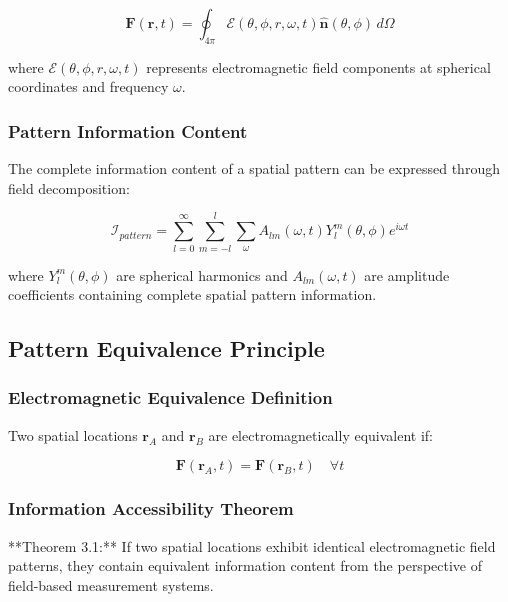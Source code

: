 \documentclass[12pt,a4paper]{article}
\begin{document}
\begin{equation}
\mathbf{F}(\mathbf{r}, t) = \oint_{4\pi} \mathcal{E}(\theta, \phi, r, \omega, t) \hat{\mathbf{n}}(\theta, \phi) \, d\Omega
\label{eq:complete_field_mapping}
\end{equation}

where $\mathcal{E}(\theta, \phi, r, \omega, t)$ represents electromagnetic field components at spherical coordinates and frequency $\omega$.

\subsubsection{Pattern Information Content}

The complete information content of a spatial pattern can be expressed through field decomposition:

\begin{equation}
\mathcal{I}_{pattern} = \sum_{l=0}^{\infty} \sum_{m=-l}^{l} \sum_{\omega} A_{lm}(\omega, t) Y_l^m(\theta, \phi) e^{i\omega t}
\label{eq:pattern_information}
\end{equation}

where $Y_l^m(\theta, \phi)$ are spherical harmonics and $A_{lm}(\omega, t)$ are amplitude coefficients containing complete spatial pattern information.

\subsection{Pattern Equivalence Principle}

\subsubsection{Electromagnetic Equivalence Definition}

Two spatial locations $\mathbf{r}_A$ and $\mathbf{r}_B$ are electromagnetically equivalent if:

\begin{equation}
\mathbf{F}(\mathbf{r}_A, t) = \mathbf{F}(\mathbf{r}_B, t) \quad \forall t
\label{eq:electromagnetic_equivalence}
\end{equation}

\subsubsection{Information Accessibility Theorem}

**Theorem 3.1:** If two spatial locations exhibit identical electromagnetic field patterns, they contain equivalent information content from the perspective of field-based measurement systems.
\end{document}
